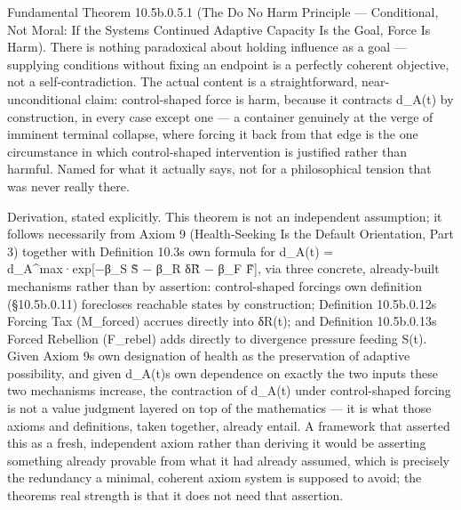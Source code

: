 \documentclass[
]{article}
\begin{document}
Fundamental Theorem 10.5b.0.5.1 (The Do No Harm Principle ---
Conditional, Not Moral: If the Systems Continued Adaptive Capacity Is
the Goal, Force Is Harm). There is nothing paradoxical about holding
influence as a goal --- supplying conditions without fixing an endpoint
is a perfectly coherent objective, not a self-contradiction. The actual
content is a straightforward, near-unconditional claim: control-shaped
force is harm, because it contracts d\_A(t) by construction, in every
case except one --- a container genuinely at the verge of imminent
terminal collapse, where forcing it back from that edge is the one
circumstance in which control-shaped intervention is justified rather
than harmful. Named for what it actually says, not for a philosophical
tension that was never really there.

Derivation, stated explicitly. This theorem is not an independent
assumption; it follows necessarily from Axiom 9 (Health-Seeking Is the
Default Orientation, Part 3) together with Definition 10.3s own formula
for d\_A(t) = d\_A\^{}max·exp{[}−β\_S S̃ − β\_R δR̃ − β\_F F̃{]}, via three
concrete, already-built mechanisms rather than by assertion:
control-shaped forcings own definition (§10.5b.0.11) forecloses
reachable states by construction; Definition 10.5b.0.12s Forcing Tax
(M\_forced) accrues directly into δR(t); and Definition 10.5b.0.13s
Forced Rebellion (F\_rebel) adds directly to divergence pressure feeding
S(t). Given Axiom 9s own designation of health as the preservation of
adaptive possibility, and given d\_A(t)s own dependence on exactly the
two inputs these two mechanisms increase, the contraction of d\_A(t)
under control-shaped forcing is not a value judgment layered on top of
the mathematics --- it is what those axioms and definitions, taken
together, already entail. A framework that asserted this as a fresh,
independent axiom rather than deriving it would be asserting something
already provable from what it had already assumed, which is precisely
the redundancy a minimal, coherent axiom system is supposed to avoid;
the theorems real strength is that it does not need that assertion.
\end{document}
